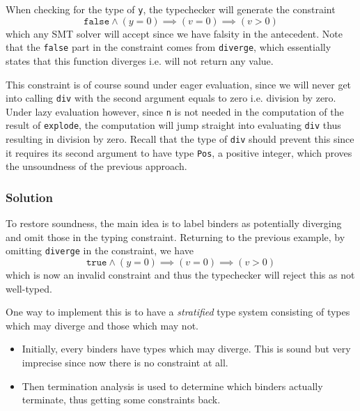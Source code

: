 \documentclass[a4paper,UKenglish]{lipics-v2016}
\begin{document}
      When checking for the type of \texttt{y}, the typechecker will generate
      the constraint
      $$\mathtt{false}\wedge(y=0)\implies(v=0)\implies(v>0)$$
      which any SMT solver will accept since we have falsity in the antecedent.
      Note that the \texttt{false} part in the constraint comes from
      \texttt{diverge}, which essentially states that this function diverges
      i.e. will not return any value.

      This constraint is of course sound under eager evaluation, since we will
      never get into calling \texttt{div} with the second argument equals to
      zero i.e. division by zero.  Under lazy evaluation however, since
      \texttt{n} is not needed in the computation of the result of
      \texttt{explode}, the computation will jump straight into evaluating
      \texttt{div} thus resulting in division by zero.  Recall that the type of
      \texttt{div} should prevent this since it requires its second argument to
      have type \texttt{Pos}, a positive integer, which proves the unsoundness
      of the previous approach.

    \subsubsection{Solution}
      
      To restore soundness, the main idea is to label binders as potentially
      diverging and omit those in the typing constraint.  Returning to the
      previous example, by omitting \texttt{diverge} in the constraint, we have
      $$\mathtt{true}\wedge(y=0)\implies(v=0)\implies(v>0)$$
      which is now an invalid constraint and thus the typechecker will reject
      this as not well-typed.

      One way to implement this is to have a \emph{stratified} type system
      consisting of types which may diverge and those which may not.
      \begin{itemize}
        \item Initially, every binders have types which may diverge.  This is
          sound but very imprecise since now there is no constraint at all.
        \item Then termination analysis is used to determine which binders
          actually terminate, thus getting some constraints back.
      \end{itemize}
\end{document}
